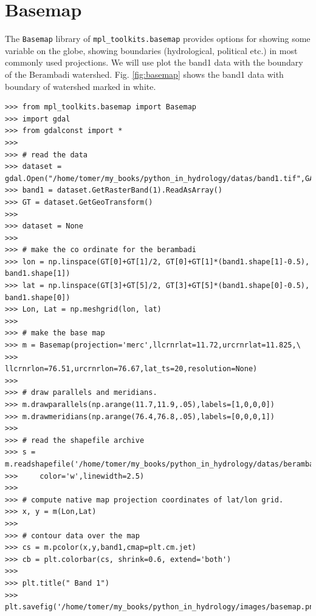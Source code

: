 \documentclass[10pt]{book}
\begin{document}
\section{Basemap}
The \verb"Basemap" library of \verb"mpl_toolkits.basemap" provides options for showing some variable on the globe, showing boundaries (hydrological, political etc.) in most commonly used projections. We will use plot the band1 data with the boundary of the Berambadi watershed. Fig. \ref{fig:basemap} shows the band1 data with boundary of watershed marked in white. 
\beforeverb \begin{verbatim}
>>> from mpl_toolkits.basemap import Basemap
>>> import gdal
>>> from gdalconst import *
>>> 
>>> # read the data
>>> dataset = gdal.Open("/home/tomer/my_books/python_in_hydrology/datas/band1.tif",GA_ReadOnly)
>>> band1 = dataset.GetRasterBand(1).ReadAsArray()
>>> GT = dataset.GetGeoTransform()
>>> 
>>> dataset = None
>>> 
>>> # make the co ordinate for the berambadi
>>> lon = np.linspace(GT[0]+GT[1]/2, GT[0]+GT[1]*(band1.shape[1]-0.5), band1.shape[1])
>>> lat = np.linspace(GT[3]+GT[5]/2, GT[3]+GT[5]*(band1.shape[0]-0.5), band1.shape[0])
>>> Lon, Lat = np.meshgrid(lon, lat)
>>> 
>>> # make the base map
>>> m = Basemap(projection='merc',llcrnrlat=11.72,urcrnrlat=11.825,\
>>>             llcrnrlon=76.51,urcrnrlon=76.67,lat_ts=20,resolution=None)
>>> 
>>> # draw parallels and meridians.
>>> m.drawparallels(np.arange(11.7,11.9,.05),labels=[1,0,0,0])
>>> m.drawmeridians(np.arange(76.4,76.8,.05),labels=[0,0,0,1])
>>> 
>>> # read the shapefile archive
>>> s = m.readshapefile('/home/tomer/my_books/python_in_hydrology/datas/berambadi','berambadi',
>>>     color='w',linewidth=2.5)
>>> 
>>> # compute native map projection coordinates of lat/lon grid.
>>> x, y = m(Lon,Lat)
>>> 
>>> # contour data over the map
>>> cs = m.pcolor(x,y,band1,cmap=plt.cm.jet)
>>> cb = plt.colorbar(cs, shrink=0.6, extend='both')
>>> 
>>> plt.title(" Band 1")
>>> plt.savefig('/home/tomer/my_books/python_in_hydrology/images/basemap.png')
\end{verbatim} \afterverb
\end{document}

